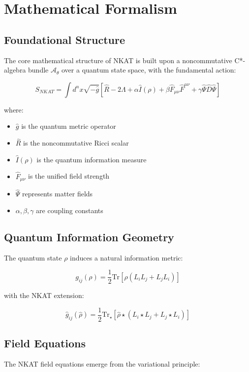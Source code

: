 \section{Mathematical Formalism}

\subsection{Foundational Structure}

The core mathematical structure of NKAT is built upon a noncommutative C*-algebra bundle \(\mathcal{A}_{\theta}\) over a quantum state space, with the fundamental action:

\[
S_{NKAT} = \int d^n x \sqrt{-\hat{g}} [\hat{R} - 2\Lambda + \alpha \hat{I}(\rho) + \beta \hat{F}_{\mu\nu}\hat{F}^{\mu\nu} + \gamma \hat{\Psi}\hat{D}\hat{\Psi}]
\]

where:
\begin{itemize}
    \item \(\hat{g}\) is the quantum metric operator
    \item \(\hat{R}\) is the noncommutative Ricci scalar
    \item \(\hat{I}(\rho)\) is the quantum information measure
    \item \(\hat{F}_{\mu\nu}\) is the unified field strength
    \item \(\hat{\Psi}\) represents matter fields
    \item \(\alpha, \beta, \gamma\) are coupling constants
\end{itemize}

\subsection{Quantum Information Geometry}

The quantum state \(\rho\) induces a natural information metric:

\[
g_{ij}(\rho) = \frac{1}{2}\text{Tr}[\rho(L_i L_j + L_j L_i)]
\]

with the NKAT extension:

\[
\hat{g}_{ij}(\hat{\rho}) = \frac{1}{2}\text{Tr}_{\star}[\hat{\rho} \star (L_i \star L_j + L_j \star L_i)]
\]

\subsection{Field Equations}

The NKAT field equations emerge from the variational principle:

